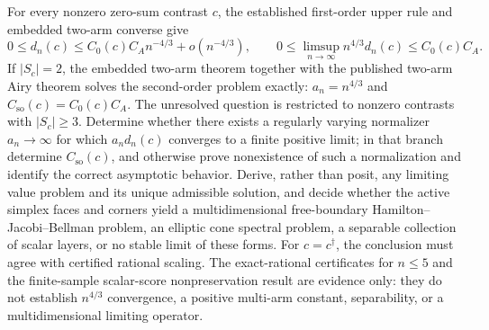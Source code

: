 For every nonzero zero-sum contrast \(c\), the established first-order upper rule and embedded two-arm converse give \[0\leq d_n(c)\leq C_0(c)C_A n^{-4/3}+o(n^{-4/3}),\qquad 0\leq\limsup_{n\to\infty}n^{4/3}d_n(c)\leq C_0(c)C_A.\] If \(|S_c|=2\), the embedded two-arm theorem together with the published two-arm Airy theorem solves the second-order problem exactly: \(a_n=n^{4/3}\) and \(C_{\mathrm{so}}(c)=C_0(c)C_A\). The unresolved question is restricted to nonzero contrasts with \(|S_c|\geq3\). Determine whether there exists a regularly varying normalizer \(a_n\to\infty\) for which \(a_nd_n(c)\) converges to a finite positive limit; in that branch determine \(C_{\mathrm{so}}(c)\), and otherwise prove nonexistence of such a normalization and identify the correct asymptotic behavior. Derive, rather than posit, any limiting value problem and its unique admissible solution, and decide whether the active simplex faces and corners yield a multidimensional free-boundary Hamilton--Jacobi--Bellman problem, an elliptic cone spectral problem, a separable collection of scalar layers, or no stable limit of these forms. For \(c=c^\dagger\), the conclusion must agree with certified rational scaling. The exact-rational certificates for \(n\leq5\) and the finite-sample scalar-score nonpreservation result are evidence only: they do not establish \(n^{4/3}\) convergence, a positive multi-arm constant, separability, or a multidimensional limiting operator.